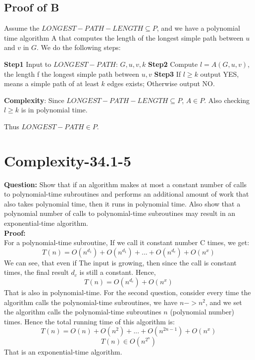 \documentclass[12pt]{article}
\begin{document}
\subsection{Proof of B}
Assume the $LONGEST-PATH-LENGTH \subseteq P$, and we have a polynomial time algorithm A that computes the length of the longest simple path between $u$ and $v$ in $G$. We do the following steps:

\textbf{Step1} Input to $LONGEST-PATH$: $G, u, v, k$
\textbf{Step2} Compute $l=A(G,u,v)$, the length f the longest simple path between $u,v$
\textbf{Step3} If $l \ge k$ output YES, means a simple path of at least $k$ edges exists; Otherwise output NO.

\textbf{Complexity}: Since $LONGEST-PATH-LENGTH \subseteq P$, $A \in P$. Also checking $l \ge k$ is in polynomial time.

Thus $LONGEST-PATH \in P$.

\section{Complexity-34.1-5}
\textbf{Question:} Show that if an algorithm makes at most a constant number of calls to polynomial-time subroutines and performs an additional amount of work that also takes polynomial time, then it runs in polynomial time. Also show that a polynomial number of
calls to polynomial-time subroutines may result in an exponential-time algorithm.\\
\textbf{Proof:}\\
For a polynomial-time subroutine, If we call it constant number C times, we get:
\[T(n) = O(n^{d_1}) + O(n^{d_1}) + ...+O(n^{d_c}) + O(n^x) \]
We can see, that even if The input is growing, then since the call is constant times, the final result \(d_c\) is still a constant.
Hence,
\[T(n) = O(n^{d_c}) + O(n^x)\]
That is also in polynomial-time.
For the second question, consider every time the algorithm calls the polynomial-time subroutines, we have \(n->n^2\), and we set the algorithm calls the polynomial-time subroutines \(n\) (polynomial number) times.
Hence the total running time of this algorithm is:
\[T(n) = O(n) + O(n^2) + ...+O(n^{2n-1}) + O(n^x) \]
\[T(n) \in O(n^{2^n})\]
That is an exponential-time algorithm.
\end{document}
